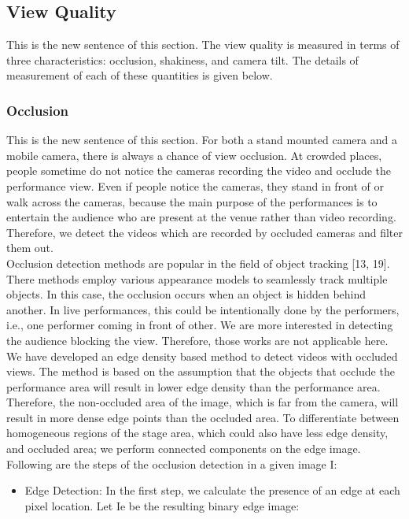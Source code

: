 \documentclass{sig-alternate}
\begin{document}
{{{\subsection{View Quality}
This is the new sentence of this section.
The view quality is measured in terms of three characteristics:
occlusion, shakiness, and camera tilt. The details of measurement
of each of these quantities is given below.
\subsubsection{Occlusion}
This is the new sentence of this section.
For both a stand mounted camera and a mobile camera, there
is always a chance of view occlusion. At crowded places, people
sometime do not notice the cameras recording the video and occlude
the performance view. Even if people notice the cameras,
they stand in front of or walk across the cameras, because the main
purpose of the performances is to entertain the audience who are
present at the venue rather than video recording. Therefore, we detect
the videos which are recorded by occluded cameras and filter
them out.\\
Occlusion detection methods are popular in the field of object
tracking [13, 19]. There methods employ various appearance models
to seamlessly track multiple objects. In this case, the occlusion
occurs when an object is hidden behind another. In live performances,
this could be intentionally done by the performers, i.e.,
one performer coming in front of other. We are more interested in
detecting the audience blocking the view. Therefore, those works
are not applicable here.\\
We have developed an edge density based method to detect videos
with occluded views. The method is based on the assumption that
the objects that occlude the performance area will result in lower
edge density than the performance area. Therefore, the non-occluded
area of the image, which is far from the camera, will result in more
dense edge points than the occluded area. To differentiate between
homogeneous regions of the stage area, which could also have less 
edge density, and occluded area; we perform connected components
on the edge image. Following are the steps of the occlusion
detection in a given image I:
\begin{itemize}
    \item Edge Detection: In the first step, we calculate the presence of
an edge at each pixel location. Let Ie be the resulting binary
edge image:
\begin{displaymath}

\end{displaymath}
\end{itemize}}}}
\end{document}
